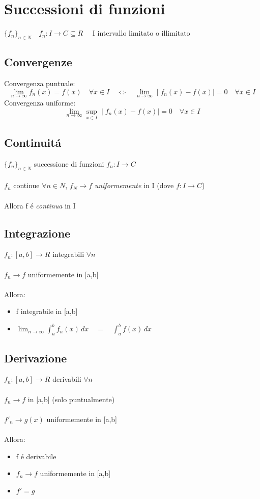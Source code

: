 \documentclass[a4paper,10pt,italian]{article}
\begin{document}
\section{Successioni di funzioni}
$\{f_n\}_{n \in N} \quad f_n:I \rightarrow C \subseteq R \quad$ I intervallo limitato o illimitato

\subsection{Convergenze}
Convergenza puntuale:
$$ \lim_{n\rightarrow\infty} f_n(x) = f(x) \quad \forall x \in I \quad \Leftrightarrow \quad \lim_{n\rightarrow\infty} \mid f_n(x) - f(x) \mid = 0 \quad \forall x \in I $$
Convergenza uniforme:
$$ \lim_{n\rightarrow\infty} \sup_{x\in I} \mid f_n(x) - f(x) \mid = 0 \quad \forall x \in I $$

\subsection{Continuit\'a}
$\{f_n\}_{n\in N}$ successione di funzioni $f_n : I \rightarrow C$ \\ \\
$f_n$ continue $\forall n \in N$, $f_N \rightarrow f$ \emph{uniformemente} in I (dove $f:I\rightarrow C$) \\ \\
Allora f \'e \emph{continua} in I

\subsection{Integrazione}
$f_n:[a,b]\rightarrow R$ integrabili $\forall n$ \\ \\
$f_n \rightarrow f$ uniformemente in [a,b] \\ \\
Allora:
\begin{itemize}
\item f integrabile in [a,b]
\item $\lim_{n\rightarrow\infty} \int_{a}^{b} f_n(x)\,dx \quad = \quad \int_{a}^{b}f(x)\,dx$
\end{itemize}

\subsection{Derivazione}
$f_n:[a,b]\rightarrow R$ derivabili $\forall n$ \\ \\
$f_n \rightarrow f$ in [a,b] (solo puntualmente)\\ \\
$f'_n \rightarrow g(x)$ uniformemente in [a,b] \\ \\
Allora:
\begin{itemize}
\item f \'e derivabile
\item $f_n \rightarrow f$ uniformemente in [a,b]
\item $f'=g$
\end{itemize}
\end{document}
